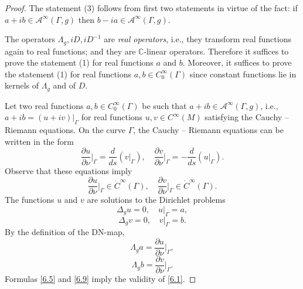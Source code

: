 \documentclass[12pt,reqno]{amsart}
\begin{document}
\begin{proof}
The statement (3) follows from first two statements in virtue of the fact: if $a+ib\in{\mathcal A}^\infty(\Gamma,g)$ then
$b-ia\in{\mathcal A}^\infty(\Gamma,g)$.

The operators $\Lambda_g,iD,iD^{-1}$ are {\it real operators}, i.e., they transform real functions again to real functions; and they are ${\mathbb C}$-linear operators. Therefore it suffices to prove the statement (1) for real functions $a$ and $b$. Moreover, it suffices to prove the statement (1) for real functions $a,b\in C^\infty_0(\Gamma)$ since constant functions lie in kernels of $\Lambda_g$ and of $D$.

Let two real functions $a,b\in C^\infty_0(\Gamma)$ be such that $a+ib\in{\mathcal A}^\infty(\Gamma,g)$, i.e., $a+ib=(u+iv)|_\Gamma$ for real functions $u,v\in C^\infty(M)$ satisfying the Cauchy -- Riemann equations. On the curve $\Gamma$, the Cauchy -- Riemann equations can be written in the form
\begin{equation}
\frac{\partial u}{\partial\nu}\Big|_\Gamma=\frac{d}{ds}(v|_\Gamma),\quad
\frac{\partial v}{\partial\nu}\Big|_\Gamma=-\frac{d}{ds}(u|_\Gamma).
                                \label{6.4}
\end{equation}
Observe that these equations imply
\begin{equation}
\frac{\partial u}{\partial\nu}\Big|_\Gamma\in \dot C^\infty(\Gamma),\quad
\frac{\partial v}{\partial\nu}\Big|_\Gamma\in \dot C^\infty(\Gamma).
                                \label{6.5}
\end{equation}
The functions $u$ and $v$ are solutions to the Dirichlet problems
\begin{equation}
\Delta_gu=0,\quad u|_\Gamma=a,
                                \label{6.6}
\end{equation}
\begin{equation}
\Delta_gv=0,\quad v|_\Gamma=b.
                                \label{6.7}
\end{equation}
By the definition of the DN-map,
\begin{equation}
\Lambda_ga=\frac{\partial u}{\partial\nu}\Big|_\Gamma,
                                \label{6.8}
\end{equation}
\begin{equation}
\Lambda_gb=\frac{\partial v}{\partial\nu}\Big|_\Gamma.
                                \label{6.9}
\end{equation}
Formulas \eqref{6.5} and \eqref{6.9} imply the validity of \eqref{6.1}.


\end{proof}
\end{document}

